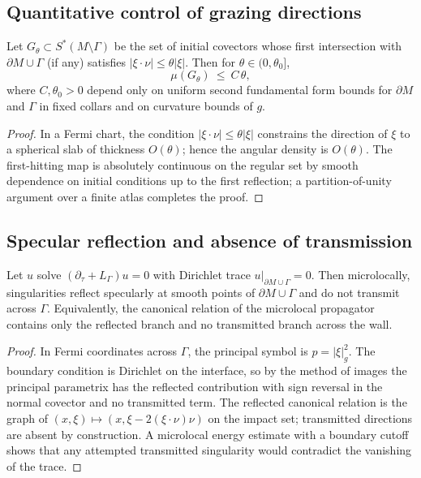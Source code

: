 \subsection{Quantitative control of grazing directions}
\begin{lemma}
\label{lem:quant-grazing}
Let $G_\theta\subset S^*(M\setminus\Gamma)$ be the set of initial covectors whose first intersection with $\partial M\cup\Gamma$ (if any) satisfies $|\xi\cdot\nu|\le \theta|\xi|$.
Then for $\theta\in(0,\theta_0]$,
\[
\mu(G_\theta)\ \le\ C\,\theta,
\]
where $C,\theta_0>0$ depend only on uniform second fundamental form bounds for $\partial M$ and $\Gamma$ in fixed collars and on curvature bounds of $g$.
\end{lemma}

\begin{proof}
In a Fermi chart, the condition $|\xi\cdot\nu|\le \theta|\xi|$ constrains the direction of $\xi$ to a spherical slab of thickness $O(\theta)$; hence the angular density is $O(\theta)$. The first-hitting map is absolutely continuous on the regular set by smooth dependence on initial conditions up to the first reflection; a partition-of-unity argument over a finite atlas completes the proof.
\end{proof}

\subsection{Specular reflection and absence of transmission}
\begin{proposition}
\label{prop:no-transmission}
Let $u$ solve $(\partial_\tau+L_\Gamma)u=0$ with Dirichlet trace $u|_{\partial M\cup\Gamma}=0$.
Then microlocally, singularities reflect specularly at smooth points of $\partial M\cup\Gamma$ and do not transmit across $\Gamma$. 
Equivalently, the canonical relation of the microlocal propagator contains only the reflected branch and no transmitted branch across the wall.
\end{proposition}

\begin{proof}
In Fermi coordinates across $\Gamma$, the principal symbol is $p=|\xi|_g^2$. The boundary condition is Dirichlet on the interface, so by the method of images the principal parametrix has the reflected contribution with sign reversal in the normal covector and no transmitted term. The reflected canonical relation is the graph of $(x,\xi)\mapsto(x,\xi-2(\xi\cdot\nu)\nu)$ on the impact set; transmitted directions are absent by construction. A microlocal energy estimate with a boundary cutoff shows that any attempted transmitted singularity would contradict the vanishing of the trace.
\end{proof}

